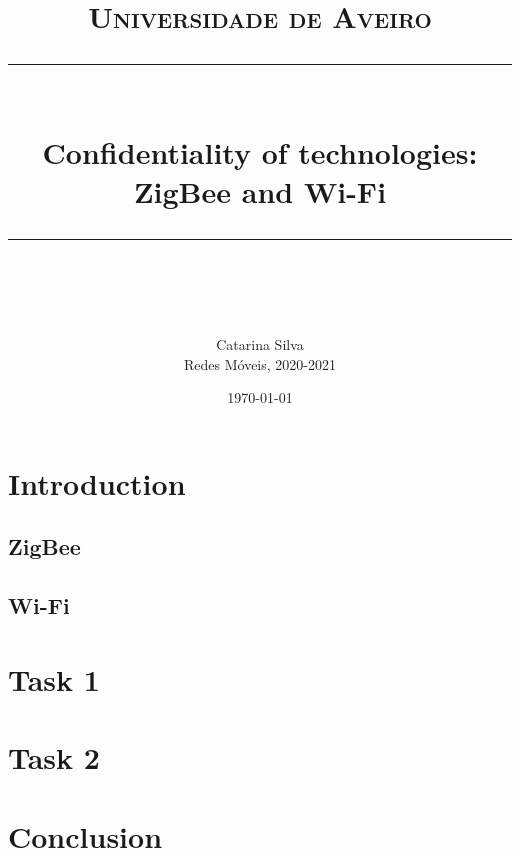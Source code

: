 \documentclass[11pt]{scrartcl} %
\title{	
	\normalfont\normalsize
	\textsc{Universidade de Aveiro}\\
	\vspace{25pt} %
	\rule{\linewidth}{0.5pt}\\ %
	\vspace{20pt} %
	{\huge Confidentiality of technologies: ZigBee and Wi-Fi}\\ %
	\vspace{12pt} %
	\rule{\linewidth}{2pt}\\ %
	\vspace{12pt} %
}
\author{\LARGE Catarina Silva \\ \large Redes Móveis, 2020-2021} %
\date{\normalsize\today} %
\begin{document}
\maketitle %

\section{Introduction}

\subsection{ZigBee}

\subsection{Wi-Fi}


\section{Task 1}

\section{Task 2}

\section{Conclusion}
\end{document}
